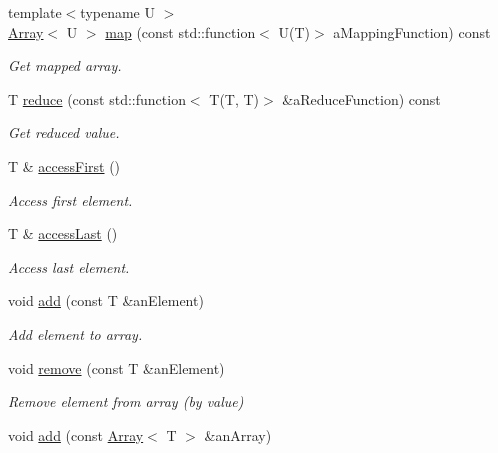 \begin{DoxyCompactItemize}
{\footnotesize template$<$typename U $>$ }\\\mbox{\hyperlink{classlibrary_1_1core_1_1ctnr_1_1_array}{Array}}$<$ U $>$ \mbox{\hyperlink{classlibrary_1_1core_1_1ctnr_1_1_array_a442dd11b5ef8bf12e84921f6d2296767}{map}} (const std\+::function$<$ U(T)$>$ a\+Mapping\+Function) const
\begin{DoxyCompactList}\small\item\em Get mapped array. \end{DoxyCompactList}\item 
T \mbox{\hyperlink{classlibrary_1_1core_1_1ctnr_1_1_array_a4636763515f791d0b9da1dfa205a65b1}{reduce}} (const std\+::function$<$ T(T, T)$>$ \&a\+Reduce\+Function) const
\begin{DoxyCompactList}\small\item\em Get reduced value. \end{DoxyCompactList}\item 
T \& \mbox{\hyperlink{classlibrary_1_1core_1_1ctnr_1_1_array_abb2068e46720e8df057b5410ac8879d5}{access\+First}} ()
\begin{DoxyCompactList}\small\item\em Access first element. \end{DoxyCompactList}\item 
T \& \mbox{\hyperlink{classlibrary_1_1core_1_1ctnr_1_1_array_ad6ea47ab09dfeebd6de0878d3ad2de25}{access\+Last}} ()
\begin{DoxyCompactList}\small\item\em Access last element. \end{DoxyCompactList}\item 
void \mbox{\hyperlink{classlibrary_1_1core_1_1ctnr_1_1_array_a388497f6bda07f69d61aa60099b991a8}{add}} (const T \&an\+Element)
\begin{DoxyCompactList}\small\item\em Add element to array. \end{DoxyCompactList}\item 
void \mbox{\hyperlink{classlibrary_1_1core_1_1ctnr_1_1_array_a8e295703797d6e41dad7a45e4101a6db}{remove}} (const T \&an\+Element)
\begin{DoxyCompactList}\small\item\em Remove element from array (by value) \end{DoxyCompactList}\item 
void \mbox{\hyperlink{classlibrary_1_1core_1_1ctnr_1_1_array_a8dd701c76ba2659ee2e438cff70fa971}{add}} (const \mbox{\hyperlink{classlibrary_1_1core_1_1ctnr_1_1_array}{Array}}$<$ T $>$ \&an\+Array)

\end{DoxyCompactItemize}
